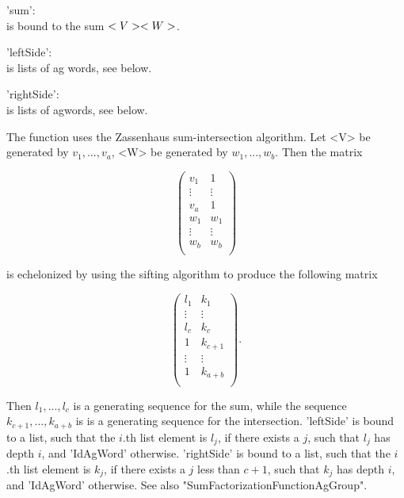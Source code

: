 'sum': \\
        is  bound  to  the  sum  $<V> \* <W>$.

'leftSide': \\
        is lists of ag words, see below.

'rightSide': \\
        is lists of agwords, see below.

The function uses the Zassenhaus sum-intersection algorithm.  Let  <V> be
generated by $v_1, ..., v_a$,  <W> be generated by $w_1, ..., w_b$.  Then
the matrix

\begin{displaymath}
    \left(
    \begin{array}{cc}
        v_1    & 1      \\
        \vdots & \vdots \\
        v_a    & 1      \\
        w_1    & w_1    \\
        \vdots & \vdots \\
        w_b    & w_b    \\
    \end{array}
    \right)
\end{displaymath}

is  echelonized  by  using the sifting algorithm to produce the following
matrix


\begin{displaymath}
    \left(
    \begin{array}{cc}
        l_1    & k_1     \\
        \vdots & \vdots   \\
        l_c    & k_c     \\
        1      & k_{c+1} \\
        \vdots & \vdots   \\
        1      & k_{a+b} \\
    \end{array}
    \right).
\end{displaymath}

Then  $l_1, ..., l_c$  is  a  generating sequence for the sum,  while the
sequence  $k_{c+1}, ..., k_{a+b}$  is  is  a  generating sequence for the
intersection.   'leftSide' is bound to a list,  such that the $i$.th list
element is $l_j$,  if there exists a $j$,  such that $l_j$ has depth $i$,
and 'IdAgWord' otherwise.  'rightSide' is bound to a list,  such that the
$i$.th  list  element  is  $k_j$,  if there exists a $j$ less than $c+1$,
such  that  $k_j$  has  depth $i$,  and  'IdAgWord'  otherwise.  See also
"SumFactorizationFunctionAgGroup".

